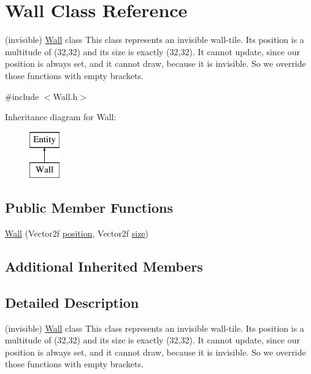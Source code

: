\hypertarget{class_wall}{}\section{Wall Class Reference}
\label{class_wall}


(invisible) \hyperlink{class_wall}{Wall} class This class represents an invisible wall-\/tile. Its position is a multitude of (32,32) and its size is exactly (32,32). It cannot update, since our position is always set, and it cannot draw, because it is invisible. So we override those functions with empty brackets.  




{\ttfamily \#include $<$Wall.\+h$>$}

Inheritance diagram for Wall\+:\begin{figure}[H]
\begin{center}
\leavevmode
\includegraphics[height=2.000000cm]{class_wall}
\end{center}
\end{figure}
\subsection*{Public Member Functions}
\begin{DoxyCompactItemize}
\item 
\hyperlink{class_wall_ad8db4b51570f4a83de3750082f826516}{Wall} (Vector2f \hyperlink{class_entity_a6af9d6498134ad0906011778bc5736db}{position}, Vector2f \hyperlink{class_entity_ae9a0a364c85f91ade5088b3610131417}{size})
\end{DoxyCompactItemize}
\subsection*{Additional Inherited Members}


\subsection{Detailed Description}
(invisible) \hyperlink{class_wall}{Wall} class This class represents an invisible wall-\/tile. Its position is a multitude of (32,32) and its size is exactly (32,32). It cannot update, since our position is always set, and it cannot draw, because it is invisible. So we override those functions with empty brackets. 

